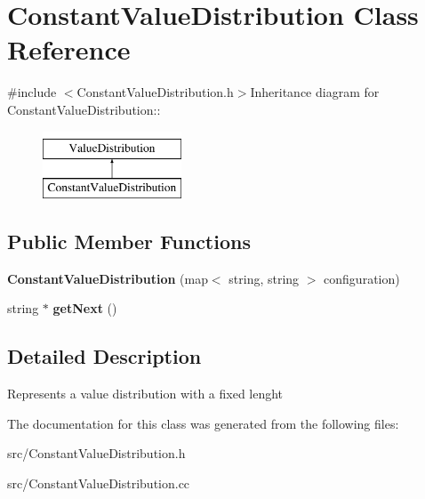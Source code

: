 \hypertarget{classConstantValueDistribution}{
\section{ConstantValueDistribution Class Reference}
\label{classConstantValueDistribution}
}


{\ttfamily \#include $<$ConstantValueDistribution.h$>$}Inheritance diagram for ConstantValueDistribution::\begin{figure}[H]
\begin{center}
\leavevmode
\includegraphics[height=2cm]{classConstantValueDistribution}
\end{center}
\end{figure}
\subsection*{Public Member Functions}
\begin{DoxyCompactItemize}
\item 
\hypertarget{classConstantValueDistribution_af232e63b78a2ecd39f1346d6d1db31c5}{
{\bfseries ConstantValueDistribution} (map$<$ string, string $>$ configuration)}
\label{classConstantValueDistribution_af232e63b78a2ecd39f1346d6d1db31c5}

\item 
\hypertarget{classConstantValueDistribution_a0e4c9a380df1cd2bde3d3267021b2071}{
string $\ast$ {\bfseries getNext} ()}
\label{classConstantValueDistribution_a0e4c9a380df1cd2bde3d3267021b2071}

\end{DoxyCompactItemize}


\subsection{Detailed Description}
Represents a value distribution with a fixed lenght 

The documentation for this class was generated from the following files:\begin{DoxyCompactItemize}
\item 
src/ConstantValueDistribution.h\item 
src/ConstantValueDistribution.cc\end{DoxyCompactItemize}
